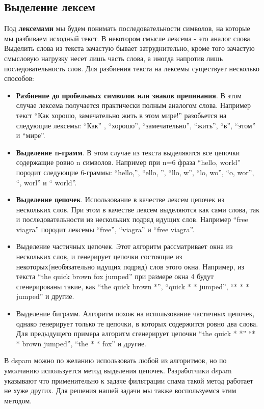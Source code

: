\subsection{Выделение лексем}
Под \textbf{лексемами} мы будем понимать последовательности символов, на которые мы разбиваем исходный текст. В некотором смысле лексема - это аналог слова. Выделить слова из текста зачастую бывает затруднительно, кроме того зачастую смысловую нагрузку несет лишь часть слова, а иногда напротив лишь последовательность слов. Для разбиения текста на лексемы существует несколько способов:
\begin{itemize}
\item \textbf{Разбиение до пробельных символов или знаков препинания}. В этом случае лексема получается практически полным аналогом слова. Например текст ``Как хорошо, замечательно жить в этом мире!'' разобьется на следующие лексемы:
 ``Как'' , ``хорошо'', ``замечательно'', ``жить'', ``в'', ``этом'' и ``мире''.

 \item \textbf{Выделение n-грамм}. В этом случае из текста выделяются все цепочки содержащие ровно n символов. Например при n=6 фраза ``hello, world'' породит следующие 6-граммы: ``hello,'', ``ello, '', ``llo, w'', ``lo, wo'', ``o, wor'', ``, worl'' и `` world''.

 \item \textbf{Выделение цепочек}. Использование в качестве лексем цепочек из нескольких слов. При этом в качестве лексем выделяются как сами слова, так и последовательности из нескольких подряд идущих слов. Например ``free viagra'' породит лексемы ``free'', ``viagra'' и ``free viagra''.
\item {Выделение частичных цепочек}. Этот алгоритм рассматривает окна из нескольких слов, и генерирует цепочки состоящие из некоторых(необязательно идущих подряд) слов этого окна. Например, из  текста ``the quick brown fox jumped'' при размере окна 4 будут сгенерированы такие, как ``the quick brown *'', ``quick * * jumped'', ``* * * jumped'' и другие.

\item {Выделение биграмм}. Алгоритм похож на использование частичных цепочек, однако генерирует только те цепочки, в которых содержится ровно два слова. Для предыдущего примера алгоритм сгенерирует цепочки ``the quick * *'' ``* * brown jumped'', ``the * * fox''  и другие.
\end{itemize}

В dspam можно по желанию использовать любой из алгоритмов, но по умолчанию используется метод выделения цепочек. Разработчики dspam указывают\cite{TOKS} что применительно к задаче фильтрации спама такой метод работает не хуже других. Для решения нашей задачи мы также воспользуемся этим методом.

